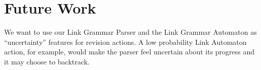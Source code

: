 \documentclass[11pt]{article}
\begin{document}
\section{Future Work}
We want to use our Link Grammar Parser and the Link Grammar Automaton as ``uncertainty'' features for revision actions. A low probability Link Automaton action, for example, would make the parser feel uncertain about its progress and it may choose to backtrack.





\newpage






\begin{comment}


\section{examples of latex things:}

\newpage

\begin{itemize}
\item Left and right margins: 2.5 cm
\item Top margin: 2.5 cm
\item Bottom margin: 2.5 cm
\item Column width: 7.7 cm
\item Column height: 24.7 cm
\item Gap between columns: 0.6 cm
\end{itemize}

\noindent noindent ensures that there is no indent on a new paragraph.


\begin{table}[h]
\begin{center}
\begin{tabular}{|l|rl|}
\hline \bf Type of Text & \bf Font Size & \bf Style \\ \hline
paper title & 15 pt & bold \\
author names & 12 pt & bold \\
author affiliation & 12 pt & \\
the word ``Abstract'' & 12 pt & bold \\
section titles & 12 pt & bold \\
document text & 11 pt  &\\
captions & 11 pt & \\
abstract text & 10 pt & \\
bibliography & 10 pt & \\
footnotes & 9 pt & \\
\hline
\end{tabular}
\end{center}
\caption{\label{font-table} Font guide. }
\end{table}



\end{comment}
\end{document}
